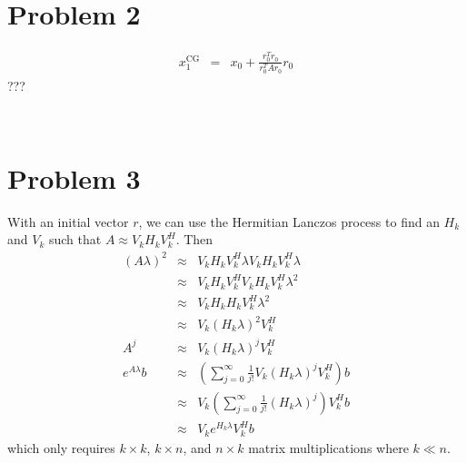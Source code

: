 \documentclass[11pt]{article}
\theoremstyle{definition}
\theoremstyle{remark}
\newcommand{\newquestion}{\hrulefill\vspace{-0.8\baselineskip}\\\null\hrulefill\vspace{-1.0\baselineskip}}
\theoremstyle{plain}
\begin{document}
\newquestion
%
%
\section*{Problem 2}
\begin{eqnarray*}
  x_1^{\textrm{CG}}&=&x_0+\frac{r_0^Tr_0}{r_0^TAr_0}r_0
\end{eqnarray*}
???

\newquestion
%
%
\section*{Problem 3}
With an initial vector $r$, we can use the Hermitian Lanczos process to find an $H_k$ and $V_k$ such that $A\approx V_kH_kV_k^H$. Then
\begin{eqnarray*}
  \left(A\lambda\right)^2&\approx&V_kH_kV_k^H\lambda V_kH_kV_k^H\lambda\\
                         &\approx&V_kH_kV_k^HV_kH_kV_k^H\lambda^2\\
     &\approx&V_kH_kH_kV_k^H\lambda^2\\
     &\approx&V_k\left(H_k\lambda \right)^2V_k^H\\
  A^j&\approx&V_k\left(H_k\lambda\right)^jV_k^H\\
  e^{A\lambda}b&\approx&\left(\sum_{j=0}^\infty\frac{1}{j!}V_k\left(H_k\lambda\right)^jV_k^H\right)b\\
     &\approx&V_k\left(\sum_{j=0}^\infty\frac{1}{j!}\left(H_k\lambda\right)^j\right)V_k^Hb\\
     &\approx&V_ke^{H_k\lambda}V_k^Hb
\end{eqnarray*}
which only requires $k\times k$, $k\times n$, and $n\times k$ matrix multiplications where $k\ll n$.

\newpage
\newquestion
%
%
\end{document}
